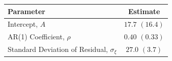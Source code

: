
\begin{tabular}[t]{lc}
\toprule
Parameter & Estimate\\
\midrule
Intercept, $A$ & $17.7$ $(16.4)$\\
AR(1) Coefficient, $\rho$ & $0.40$ $(0.33)$\\
Standard Deviation of Residual, $\sigma_\xi$ & $27.0$ $(3.7)$\\
\bottomrule
\end{tabular}
